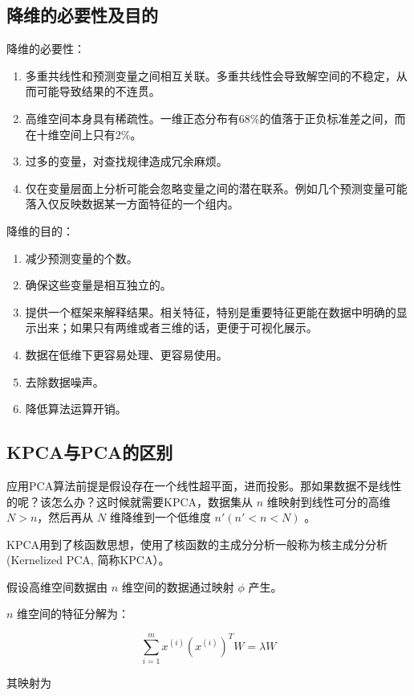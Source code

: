 \subsection{降维的必要性及目的}

降维的必要性：

\begin{enumerate}
	\itemsep0em 
	\item 多重共线性和预测变量之间相互关联。多重共线性会导致解空间的不稳定，从而可能导致结果的不连贯。
	\item 高维空间本身具有稀疏性。一维正态分布有$68\%$的值落于正负标准差之间，而在十维空间上只有$2\%$。
	\item 过多的变量，对查找规律造成冗余麻烦。
	\item 仅在变量层面上分析可能会忽略变量之间的潜在联系。例如几个预测变量可能落入仅反映数据某一方面特征的一个组内。
\end{enumerate}

降维的目的：

\begin{enumerate}
	\item 减少预测变量的个数。
	\item 确保这些变量是相互独立的。
	\item 提供一个框架来解释结果。相关特征，特别是重要特征更能在数据中明确的显示出来；如果只有两维或者三维的话，更便于可视化展示。
	\item 数据在低维下更容易处理、更容易使用。
	\item 去除数据噪声。
	\item 降低算法运算开销。
\end{enumerate}

\subsection{KPCA与PCA的区别}

应用PCA算法前提是假设存在一个线性超平面，进而投影。那如果数据不是线性的呢？该怎么办？这时候就需要KPCA，数据集从 $n$ 维映射到线性可分的高维 $N >n$，然后再从 $N$ 维降维到一个低维度 $n'(n'<n<N)$ 。

KPCA用到了核函数思想，使用了核函数的主成分分析一般称为核主成分分析(Kernelized PCA, 简称KPCA）。

假设高维空间数据由 $n$ 维空间的数据通过映射 $\phi$ 产生。

$n$ 维空间的特征分解为：

$$
\sum^m_{i=1} x^{(i)} \left( x^{(i)} \right)^T W = \lambda W
$$

其映射为

